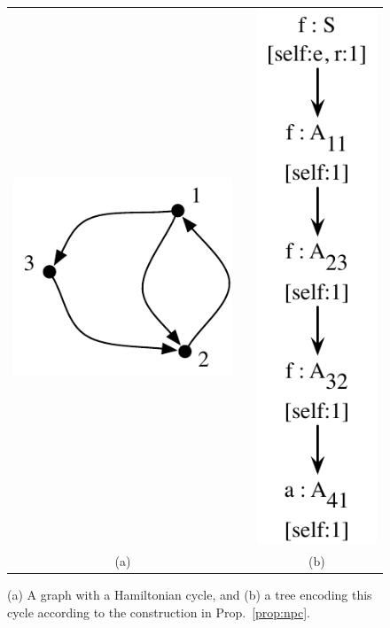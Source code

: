 \documentclass[11pt,a4]{article}
\theoremstyle{plain}
\theoremstyle{definition}
\begin{document}
\begin{figure}
  \centering
  \begin{tabular}{cp{2cm}c}
  \includegraphics[scale=0.5]{pic-npc-graph}
  &&
  \includegraphics[scale=0.5]{pic-npc} \\
  (a) && (b)
  \end{tabular}
  \caption{(a) A graph with a Hamiltonian cycle, and (b) a tree
    encoding this cycle according to the construction in
    Prop.~\ref{prop:npc}.} 
  \label{fig:npc}
\end{figure}
\end{document}
